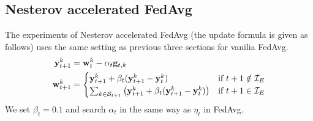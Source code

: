 \subsection{Nesterov accelerated FedAvg}
The experiments of Nesterov accelerated FedAvg (the update formula is given as follows) uses the same setting as
previous three sections for vanilia FedAvg.
\begin{align*}
{\mathbf{y}}_{t+1}^{k} & ={\mathbf{w}}_{t}^{k}-\alpha_{t}{\mathbf{g}}_{t,k}\\
{\mathbf{w}}_{t+1}^{k} & =\begin{cases}
{\mathbf{y}}_{t+1}^{k}+\beta_{t}({\mathbf{y}}_{t+1}^{k}-{\mathbf{y}}_{t}^{k}) & \text{if }t+1\notin\mathcal{I}_{E}\\
\sum_{k\in\mathcal{S}_{t+1}}\left({\mathbf{y}}_{t+1}^{k}+\beta_{t}({\mathbf{y}}_{t+1}^{k}-{\mathbf{y}}_{t}^{k})\right) & \text{if }t+1\in\mathcal{I}_{E}
\end{cases}
\end{align*}
We set $\beta_t = 0.1$ and search $\alpha_t$ in the same way as $\eta_t$
in FedAvg.


